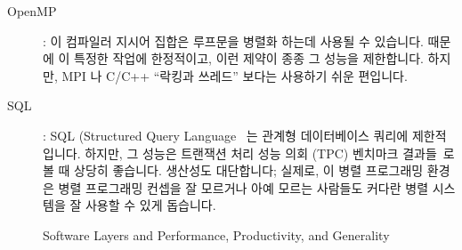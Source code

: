 \begin{description}
\item[OpenMP]: 이 컴파일러 지시어 집합은 루프문을 병렬화 하는데 사용될 수
	있습니다.
	때문에 이 특정한 작업에 한정적이고, 이런 제약이 종종 그 성능을
	제한합니다.
	하지만, MPI 나 C/C++ ``락킹과 쓰레드'' 보다는 사용하기 쉬운 편입니다.

\item[SQL]: SQL (Structured Query Language~\cite{DIS9075SQL92} 는 관계형
	데이터베이스 쿼리에 제한적입니다.
	하지만, 그 성능은 트랜잭션 처리 성능 의회 (TPC) 벤치마크
	결과들~\cite{TPC}로 볼 때 상당히 좋습니다.
	생산성도 대단합니다; 실제로, 이 병렬 프로그래밍 환경은 병렬 프로그래밍
	컨셉을 잘 모르거나 아예 모르는 사람들도 커다란 병렬 시스템을 잘 사용할
	수 있게 돕습니다.

\end{description}

\begin{figure}[tb]
\centering
{}
\caption{Software Layers and Performance, Productivity, and Generality}
\label{fig:intro:Software Layers and Performance, Productivity, and Generality}
\end{figure}

